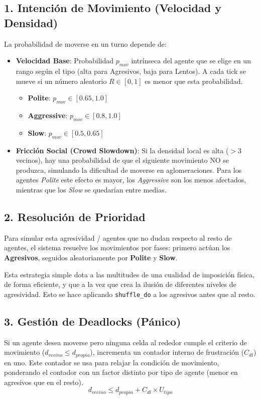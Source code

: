 \documentclass[11pt,spanish,listoffigures,listoftables]{tfgetsinf}
\begin{document}
\subsection{1. Intención de Movimiento (Velocidad y Densidad)}
La probabilidad de moverse en un turno depende de:
\begin{itemize}
    \item \textbf{Velocidad Base}: Probabilidad $p_{mov}$ intrínseca del agente que se elige en un rango según el tipo (alta para Agresivos, baja para Lentos). A cada tick se mueve si un número aleatorio $R \in [0,1]$ es menor que esta probabilidad.
    \begin{itemize}
        \item \textbf{Polite}: $p_{mov} \in [0.65, 1.0]$
        \item \textbf{Aggressive}: $p_{mov} \in [0.8, 1.0]$
        \item \textbf{Slow}: $p_{mov} \in [0.5, 0.65]$
    \end{itemize}
    \item \textbf{Fricción Social (Crowd Slowdown)}: Si la densidad local es alta ($>3$ vecinos), hay una probabilidad de que el siguiente movimiento NO se produzca, simulando la dificultad de moverse en aglomeraciones. Para los agentes \textit{Polite} este efecto es mayor, los \textit{Aggressive} son los menos afectados, mientras que los \textit{Slow} se quedarían entre medias.
\end{itemize}

\subsection{2. Resolución de Prioridad}
Para simular esta agresividad / agentes que no dudan respecto al resto de agentes, el sistema resuelve los movimientos por fases: primero actúan los \textbf{Agresivos}, seguidos aleatoriamente por \textbf{Polite} y \textbf{Slow}.

Esta estrategia simple dota a las multitudes de una cualidad de imposición física, de forma eficiente, y que a la vez que crea la ilusión de diferentes niveles de agresividad. Esto se hace aplicando \texttt{shuffle\_do} a los agresivos antes que al resto.

\subsection{3. Gestión de Deadlocks (Pánico)}
Si un agente desea moverse pero ninguna celda al rededor cumple el criterio de movimiento ($d_{vecino} \leq d_{propia}$), incrementa un contador interno de frustración ($C_{dl}$) en uno. Este contador se usa para relajar la condición de movimiento, ponderando el contador con un factor distinto por tipo de agente (menor en agresivos que en el resto).
$$
d_{vecino} \leq d_{propia} + C_{dl} \times U_{tipo}
$$ 
\end{document}
